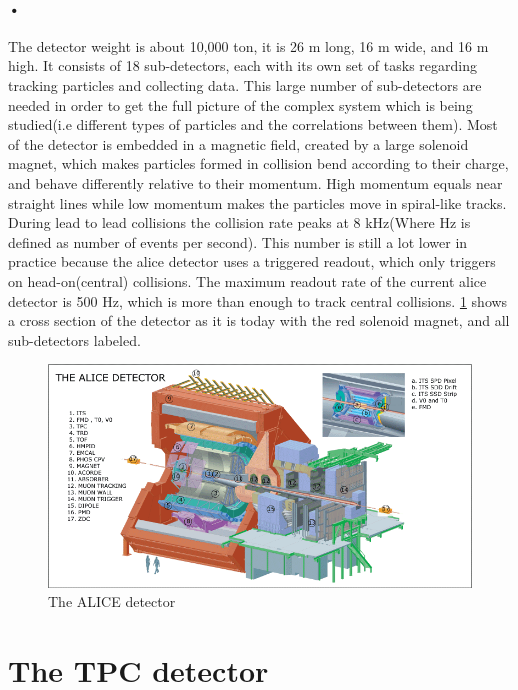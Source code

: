 \documentclass[a4paper]{report}
\begin{document}
\paragraph{•}
The detector weight is about 10,000 ton, it is 26 m long, 16 m wide, and 16 m high.\cite{alice-about}
It consists of 18 sub-detectors, each with its own set of tasks regarding tracking particles and collecting data.
This large number of sub-detectors are needed in order to get the full picture of the complex system which is being studied(i.e different types of particles and the correlations between them).
Most of the detector is embedded in a magnetic field, created by a large solenoid magnet, which makes particles formed in collision bend according to their charge, and behave differently relative to their momentum. High momentum equals near straight lines while low momentum makes the particles move in spiral-like tracks.
During lead to lead collisions the collision rate peaks at 8 kHz(Where Hz is defined as number of events per second).
This number is still a lot lower in practice because the \gls{alice} detector uses a triggered readout, which only triggers on head-on(central) collisions.
The maximum readout rate of the current \gls{alice} detector is 500 Hz, which is more than enough to track central collisions.
\ref{fig:alice} shows a cross section of the detector as it is today with the red solenoid magnet, and all sub-detectors labeled.

\begin{figure}[h!]
  \centering
    \includegraphics[width=1.0\textwidth]{images/alice-detector.png}
     \caption{The ALICE detector}
    \label{fig:alice}
\end{figure}

\section{The TPC detector}
\end{document}
